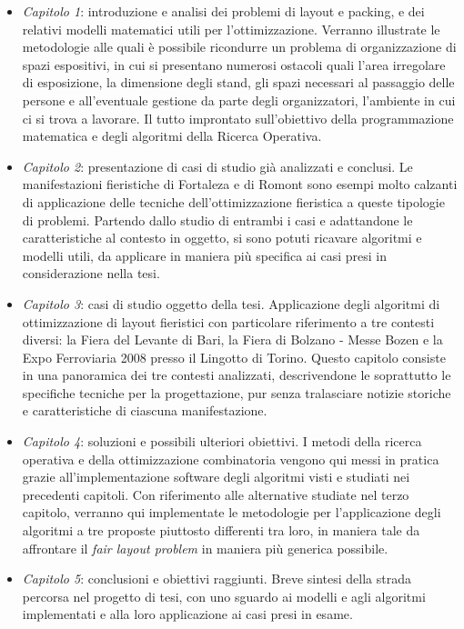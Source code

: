 \documentclass[12pt,a4paper,openright,twoside]{report}
\begin{document}
\begin{itemize}
\item \emph{Capitolo 1}: introduzione e analisi dei problemi di layout e packing, e dei relativi modelli matematici utili per l'ottimizzazione. Verranno illustrate le metodologie alle quali \`{e} possibile ricondurre un problema di organizzazione di spazi espositivi, in cui si presentano numerosi ostacoli quali l'area irregolare di esposizione, la dimensione degli stand, gli spazi necessari al passaggio delle persone e all'eventuale gestione da parte degli organizzatori, l'ambiente in cui ci si trova a lavorare. Il tutto improntato sull'obiettivo della programmazione matematica e degli algoritmi della Ricerca Operativa.
\item \emph{Capitolo 2}: presentazione di casi di studio gi\`{a} analizzati e conclusi.  Le manifestazioni fieristiche di Fortaleza e di Romont sono esempi molto calzanti di applicazione delle tecniche dell'ottimizzazione fieristica a queste tipologie di problemi. Partendo dallo studio di entrambi i casi e adattandone le caratteristiche al contesto in oggetto, si sono potuti ricavare algoritmi e modelli utili, da applicare in maniera pi\`{u} specifica ai casi presi in considerazione nella tesi.
\item \emph{Capitolo 3}:  casi di studio oggetto della tesi. Applicazione degli algoritmi di ottimizzazione di layout fieristici con particolare riferimento a tre contesti diversi: la Fiera del Levante di Bari, la Fiera di Bolzano - Messe Bozen e la Expo Ferroviaria 2008 presso il Lingotto di Torino. Questo capitolo consiste in una panoramica dei tre contesti analizzati, descrivendone le soprattutto le specifiche tecniche per la progettazione, pur senza tralasciare notizie storiche e caratteristiche di ciascuna manifestazione.
\item \emph{Capitolo 4}: soluzioni e possibili ulteriori obiettivi. I metodi della ricerca operativa e della ottimizzazione combinatoria vengono qui messi in pratica grazie all'implementazione software degli algoritmi visti e studiati nei precedenti capitoli. Con riferimento alle alternative studiate nel terzo capitolo, verranno qui implementate le metodologie per l'applicazione degli algoritmi a tre proposte piuttosto differenti tra loro, in maniera tale da affrontare il \textit{fair layout problem} in maniera  pi\`{u} generica possibile.
\item \emph{Capitolo 5}: conclusioni e obiettivi raggiunti. Breve sintesi della strada percorsa nel progetto di tesi, con uno sguardo ai modelli e agli algoritmi implementati e alla loro applicazione ai casi presi in esame.
\end{itemize}
\rhead[\fancyplain{}{\bfseries\leftmark}]{\fancyplain{}{\bfseries\thepage}}
\end{document}
